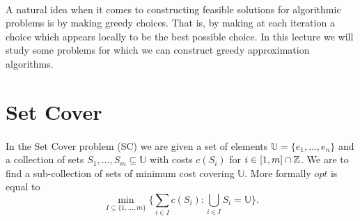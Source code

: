 \documentclass[letterpaper,12pt,oneside,onecolumn]{article}
\newcommand{\U}{\mathbb{U}}
\begin{document}
\paragraph{}
A natural idea when it comes to constructing feasible solutions for algorithmic problems is by making greedy choices. That is, by making at each iteration a choice which appears locally to be the best possible choice. In this lecture we will study some problems for which we can construct greedy approximation algorithms.
\section{Set Cover}
\paragraph{}
In the Set Cover problem (SC) we are given a set of elements $\U = \{e_1, \dots, e_n\}$ and a collection of sets $S_1, \dots, S_m \subseteq \U$ with costs $c(S_i)$ for $i \in [1,m] \cap \mathbb{Z}$. We are to find a sub-collection of sets of minimum cost covering $\U$. More formally $opt$ is equal to
$$\min_{I \subseteq \{1,\dots,m\}} \{ \sum_{i \in I} c(S_i) : \bigcup_{i \in I} S_i = \U \}.$$
\end{document}
